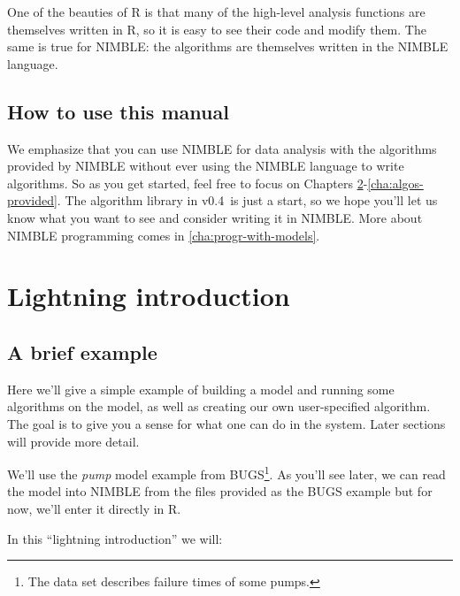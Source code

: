\documentclass[12pt,oneside]{book}\usepackage[]{graphicx}\usepackage[]{color}
\def\nm#1{\textit{#1}}
\newcommand{\ver}{0.4}
\begin{document}
One of the beauties of R is that many of the high-level analysis
functions are themselves written in R, so it is easy to see their code and modify
them.  The same is true for NIMBLE: the algorithms are themselves
written in the NIMBLE language.

\section{How to use this manual}
We emphasize that you can use NIMBLE for data analysis with the
algorithms provided by NIMBLE without ever using the NIMBLE language
to write algorithms. So as you get started, feel free to focus on
Chapters \ref{cha:intro}-\ref{cha:algos-provided}.  The algorithm
library in v\ver\ is just a start, so we hope you'll let us know what
you want to see and consider writing it in NIMBLE.  More about NIMBLE
programming comes in \ref{cha:progr-with-models}.









\chapter{Lightning introduction}
\label{cha:intro}

\section{A brief example}
\label{sec:brief-example}

Here we'll give a simple example of building a model and running some algorithms on the model, as well as creating our own user-specified algorithm. The goal is to give you a sense for what one can do in the system. Later sections will provide more detail.

We'll use the \nm{pump} model example from BUGS\footnote{The data set
  describes failure times of some pumps.}. As you'll see later, we can
read the model into NIMBLE from the files provided as the
BUGS example but for now, we'll enter it directly in R.

In this ``lightning introduction'' we will:
\end{document}
